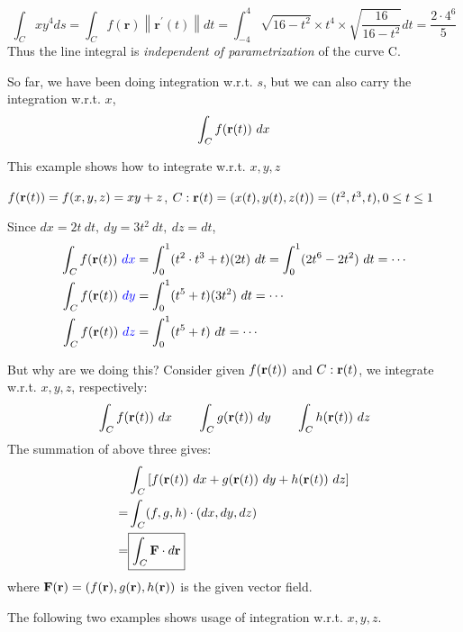 \begin{spacing}{1.3}
    $$ \int_{C} x y^{4} d s =\int_{C} f(\mathbf{r})\left\|\mathbf{r}^{\prime}(t)\right\| d t
    =\int_{-4}^{4} \sqrt{16-t^{2}} \times t^{4} \times \sqrt{\frac{16}{16-t^{2}}} d t=\frac{2\cdot 4^6}{5}$$
    Thus the line integral is {\it \blue independent of parametrization} of the curve C.

    So far, we have been doing integration w.r.t. $s$, but we can also carry the integration w.r.t. $x$,
    $$\int_C f({\bf r}(t))\ dx$$

    \vspace{0.3in}
    {\blue This example shows how to integrate w.r.t. $x,y,z$}

    \eg $f({\bf r}(t))=f(x,y,z)=xy+z$, $C: {\bf r}(t)=(x(t), y(t), z(t)) = (t^2, t^3, t), 0\le t\le 1$

    \sol Since $dx=2t\ dt,\ dy=3t^2\ dt,\ dz=dt$,
    \begin{align*}
        \int_C f(\rr(t))\ {\blue dx} &= \int_0^1 (t^2\cdot t^3+t)(2t)\ dt=\int_0^1 (2t^6-2t^2)\ dt=\cdots\\
        \int_C f(\rr(t))\ {\blue dy} &= \int_0^1 (t^5+t)(3t^2)\ dt=\cdots\\
        \int_C f(\rr(t))\ {\blue dz} &= \int_0^1 (t^5+t)\ dt=\cdots
    \end{align*}

    \vspace{0.8in}
    But why are we doing this? Consider given $f({\bf r}(t))$ and $C: {\bf r}(t)$, we integrate w.r.t. $x,y,z$, respectively: 
    $$\int_C f({\bf r}(t))\ dx\qquad \int_C g({\bf r}(t))\ dy\qquad \int_C h({\bf r}(t))\ dz$$
    The summation of above three gives: 
    \begin{align*}
        & \int_C \left[f(\rr(t))\ dx + g(\rr(t))\ dy + h(\rr(t))\ dz\right]\\
        =& \int_C (f, g, h) \cdot (dx, dy, dz)\\
        =& \boxed{\int_C \FF \cdot d\rr}
    \end{align*}
    where ${\bf F}({\bf r})=\left(f({\bf r}), g({\bf r}), h({\bf r})\right)$ is the given vector field.


    \newpage
    {\blue The following two examples shows usage of integration w.r.t. $x, y, z$.}


\end{spacing}
